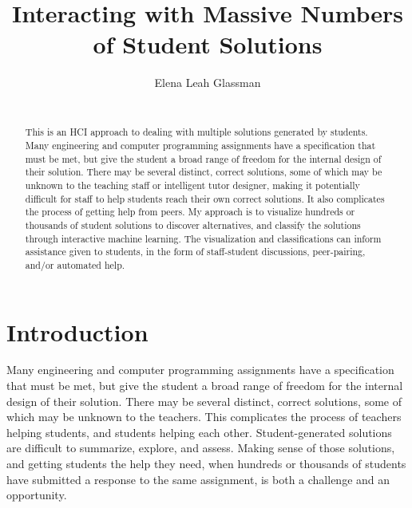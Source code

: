 \documentclass{sigchi}
\begin{document}
\title{Interacting with Massive Numbers of Student Solutions}

\author{
  \alignauthor Elena Leah Glassman\\
    \\
}

\maketitle

\begin{abstract}
This is an HCI approach to dealing with multiple solutions generated by students. Many engineering and computer programming assignments have a specification that must be met, but give the student a broad range of freedom for the internal design of their solution. There may be several distinct, correct solutions, some of which may be unknown to the teaching staff or intelligent tutor designer, making it potentially difficult for staff to help students reach their own correct solutions. It also complicates the process of getting help from peers. My approach is to visualize hundreds or thousands of student solutions to discover alternatives, and classify the solutions through interactive machine learning. The visualization and classifications can inform assistance given to students, in the form of staff-student discussions, peer-pairing, and/or automated help.
\end{abstract}



\section{Introduction}

Many engineering and computer programming assignments have a specification that must be met, but give the student a broad range of freedom for the internal design of their solution. There may be several distinct, correct solutions, some of which may be unknown to the teachers. This complicates the process of teachers helping students, and students helping each other. Student-generated solutions are difficult to summarize, explore, and assess. Making sense of those solutions, and getting students the help they need, when hundreds or thousands of students have submitted a response to the same assignment, is both a challenge and an opportunity. 
\end{document}
